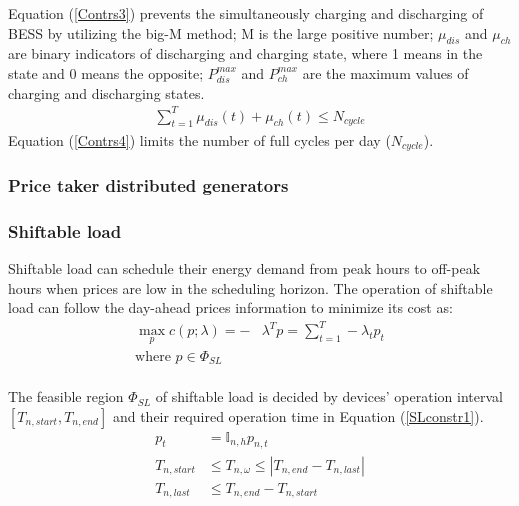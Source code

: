 \documentclass[journal]{IEEEtran}
\begin{document}
Equation (\ref{Contrs3}) prevents the simultaneously charging and discharging of BESS by utilizing the big-M method; M is the large positive number; $\mu_{dis}$ and $\mu_{ch}$ are binary indicators of discharging and charging state, where 1 means in the state and 0 means the opposite; $P_{dis}^{max}$ and $P_{ch}^{max}$ are the maximum values of charging and discharging states.
\begin{equation}
  \label{Contrs4}
  \begin{aligned}
    \sum_{t=1}^T \mu_{dis}(t) + \mu_{ch}(t) \leq N_{cycle}
  \end{aligned}
\end{equation}
Equation (\ref{Contrs4}) limits the number of full cycles per day ($N_{cycle}$).


\subsubsection{Price taker distributed generators}

\subsubsection{Shiftable load}
Shiftable load can schedule their energy demand from peak hours to off-peak hours when prices are low in the scheduling horizon. The operation of shiftable load can follow the day-ahead prices information to minimize its cost as: 
\begin{equation}
  \label{SLobj}
  \begin{aligned}
    \max_{p} c(p; \lambda) = - &\lambda^T p = \sum_{t=1}^T - \lambda_t p_t \\
    \text{where }  p \in \Phi_{SL} \\
  \end{aligned}
\end{equation}

The feasible region $\Phi_{SL}$ of shiftable load is decided by devices' operation interval $[T_{n, start}, T_{n, end}]$ and their required operation time in Equation (\ref{SLconstr1}).
\begin{equation}
  \label{SLconstr1}
  \begin{aligned}
    p_t &= \mathbb{I} _{n,h} p_{n, t} \\
    T_{n, start} &\leq T_{n, \omega} \leq |T_{n, end}-T_{n, last}| \\
    T_{n, last} &\leq T_{n, end} - T_{n, start}
  \end{aligned}
\end{equation}
\end{document}

